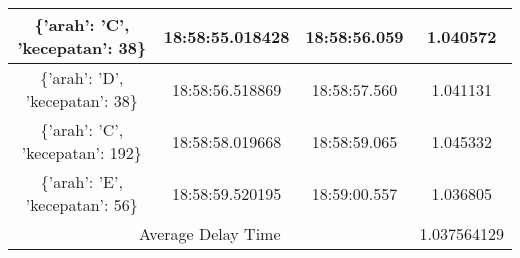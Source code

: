 \begin{longtable}{|ccc|c|}
    \multicolumn{1}{|c|}{\{'arah': 'C', 'kecepatan': 38\}}  & \multicolumn{1}{c|}{18:58:55.018428} & 18:58:56.059       & 1.040572    \\ \hline
    \multicolumn{1}{|c|}{\{'arah': 'D', 'kecepatan': 38\}}  & \multicolumn{1}{c|}{18:58:56.518869} & 18:58:57.560       & 1.041131    \\ \hline
    \multicolumn{1}{|c|}{\{'arah': 'C', 'kecepatan': 192\}} & \multicolumn{1}{c|}{18:58:58.019668} & 18:58:59.065       & 1.045332    \\ \hline
    \multicolumn{1}{|c|}{\{'arah': 'E', 'kecepatan': 56\}}  & \multicolumn{1}{c|}{18:58:59.520195} & 18:59:00.557       & 1.036805    \\ \hline
    \multicolumn{3}{|c|}{Average Delay Time}                                                                            & 1.037564129 \\ \hline
\end{longtable}


